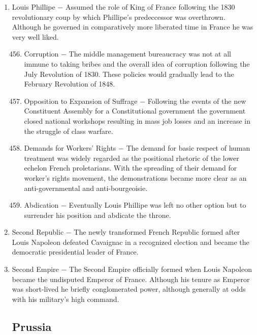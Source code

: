\documentclass[12pt]{article}
\begin{document}
\begin{enumerate}
\item Louis Phillipe $-$ Assumed the role of King of France following the 1830 revolutionary coup by which Phillipe's predeccessor was overthrown. Although he governed in comparatively more liberated time in France he was very well liked.

\begin{enumerate}[label=\arabic{*}.]
\setcounter{enumii}{455}

\item Corruption $-$ The middle management bureaucracy was not at all immune to taking bribes and the overall idea of corruption following the July Revolution of 1830. These policies would gradually lead to the February Revolution of 1848.

\item Opposition to Expansion of Suffrage $-$ Following the events of the new Constituent Assembly for a Constitutional government the government closed national workshops resulting in mass job losses and an increase in the struggle of class warfare.

\item Demands for Workers' Rights $-$ The demand for basic respect of human treatment was widely regarded as the positional rhetoric of the lower echelon French proletarians. With the spreading of their demand for worker's rights movement, the demonstrations became more clear as an anti-governmental and anti-bourgeoisie.

\item Abdication $-$ Eventually Louis Phillipe was left no other option but to surrender his position and abdicate the throne.

\end{enumerate}
\setcounter{enumi}{459}

\item Second Republic $-$ The newly transformed French Republic formed after Louis Napoleon defeated Cavaignac in a recognized election and became the democratic presidential leader of France.

\item Second Empire $-$ The Second Empire officially formed when Louis Napoleon became the undisputed Emperor of France. Although his tenure as Emperor was short-lived he briefly conglomerated power, although generally at odds with his military's high command.

\subsection{Prussia}


\end{enumerate}
\end{document}
